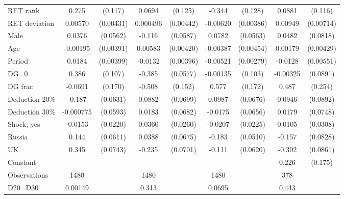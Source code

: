 \begin{tabular}{l|cccccc|cc}
\hline
RET rank        &    0.275\sym{**} &  (0.117)&   0.0694         &  (0.125)&   -0.344\sym{***}&  (0.128)&   0.0881         &  (0.116)\\
RET deviation   &  0.00570         &(0.00431)& 0.000496         &(0.00442)& -0.00620         &(0.00386)&  0.00949         &(0.00714)\\
Male            &   0.0376         & (0.0562)&   -0.116\sym{**} & (0.0587)&   0.0782         & (0.0563)&   0.0482         & (0.0818)\\
Age             & -0.00195         &(0.00391)&  0.00583         &(0.00420)& -0.00387         &(0.00454)&  0.00179         &(0.00429)\\
Period          &   0.0184\sym{***}&(0.00399)&  -0.0132\sym{***}&(0.00396)& -0.00521\sym{*}  &(0.00279)&  -0.0128\sym{**} &(0.00551)\\
DG=0          &    0.386\sym{***}&  (0.107)&   -0.385\sym{***}& (0.0577)& -0.00135         &  (0.103)& -0.00325         & (0.0891)\\
DG frac         &  -0.0691         &  (0.170)&   -0.508\sym{***}&  (0.152)&    0.577\sym{***}&  (0.172)&    0.487\sym{*}  &  (0.254)\\
Deduction 20\%&   -0.187\sym{***}& (0.0631)&   0.0882         & (0.0699)&   0.0987         & (0.0676)&   0.0946         & (0.0892)\\
Deduction 30\%&-0.000775         & (0.0593)&   0.0183         & (0.0682)&  -0.0175         & (0.0656)&   0.0179         & (0.0748)\\
Shock, yes    &  -0.0153         & (0.0220)&   0.0360         & (0.0260)&  -0.0207         & (0.0225)&   0.0105         & (0.0308)\\
Russia        &    0.144\sym{**} & (0.0611)&   0.0388         & (0.0675)&   -0.183\sym{***}& (0.0510)&   -0.157\sym{*}  & (0.0828)\\
UK            &    0.345\sym{***}& (0.0743)&   -0.235\sym{***}& (0.0701)&   -0.111\sym{*}  & (0.0620)&   -0.302\sym{***}& (0.0861)\\
Constant        &                  &         &                  &         &                  &         &    0.226         &  (0.175)\\
\hline
Observations    &     1480         &         &     1480         &         &     1480         &         &      378         &         \\
D20=D30         &  0.00149         &         &    0.313         &         &   0.0695         &         &    0.443         &         \\

\end{tabular}
